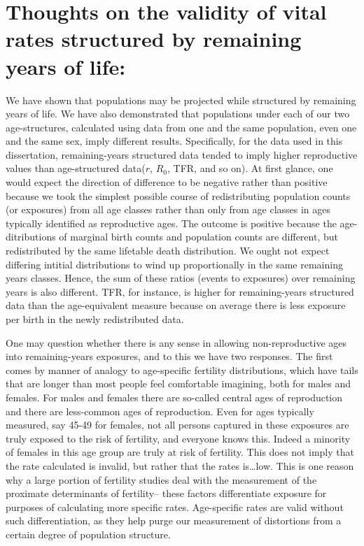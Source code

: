 \section{Thoughts on the validity of vital rates structured by remaining
years of life: }
We have shown that populations may be projected while structured by
remaining years of life. We have also demonstrated that populations under each
of our two age-structures, calculated using data from one and the same
population, even one and the same sex, imply different results. Specifically, for the data used in this
dissertation, remaining-years structured data tended to imply higher
reproductive values than age-structured data($r$, $R_0$, TFR, and so
on). At first glance, one would expect the direction of difference to be
negative rather than positive because we took the simplest possible course of
redistributing population counts (or exposures) from all age classes rather than
only from age classes in ages typically identified as reproductive ages. The
outcome is positive because the age-ditributions of marginal birth counts and
population counts are different, but redistributed by the same lifetable death
distribution. We ought not expect differing intitial distributions to wind up
proportionally in the same remaining years classes. Hence, the sum of these
ratios (events to exposures) over remaining years is also different. TFR, for
instance, is higher for remaining-years structured data than the age-equivalent
measure because on average there is less exposure per birth in the newly
redistributed data.

One may question whether there is any sense in allowing non-reproductive ages
into remaining-years exposures, and to this we have two responses. The first
comes by manner of analogy to age-specific fertility distributions, which
have tails that are longer than most people feel comfortable imagining, 
both for males and females. For males and
females there are so-called central ages of reproduction and there are
less-common ages of reproduction. Even for ages typically measured, say
45-49 for females, not all persons captured in these exposures are truly
exposed to the risk of fertility, and everyone knows this. Indeed a minority
of females in this age group are truly at risk of fertility. This does not imply
that the rate calculated is invalid, but rather that the rates is\ldots low.
This is one reason why a large portion of fertility studies deal with the
measurement of the proximate determinants of fertility-- these
factors differentiate exposure for purposes of calculating more specific rates.
Age-specific rates are valid without such differentiation, as they help purge
our measurement of distortions from a certain degree of population structure. 

